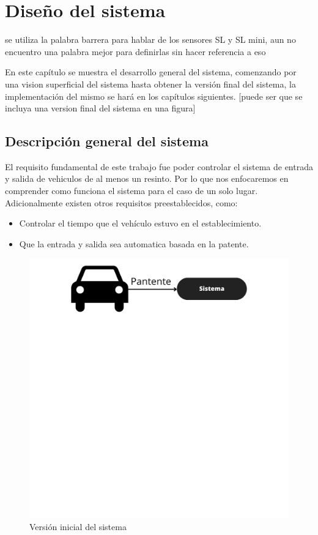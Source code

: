 \chapter{Diseño del sistema}

 {\huge se utiliza la palabra barrera para hablar de los sensores SL y SL mini, aun no encuentro una palabra mejor para definirlas sin hacer referencia a eso}

En este capítulo se muestra el desarrollo general del sistema, comenzando por una vision superficial del sistema hasta obtener la versión final del sistema, la implementación del mismo se hará en los capítulos siguientes. [puede ser que se incluya una version final del sistema en una figura]
\section{Descripción general del sistema}

El requisito fundamental de este trabajo fue poder controlar el sistema de entrada y salida de vehiculos de al menos un resinto. Por lo que nos enfocaremos en comprender como funciona el sistema para el caso de un solo lugar. Adicionalmente existen otros requisitos preestablecidos, como:

\begin{itemize}
    \item Controlar el tiempo que el vehículo estuvo en el establecimiento.
    \item Que la entrada y salida sea automatica basada en la patente.
\end{itemize}


\begin{figure}
    \centering
    \includegraphics[width=.8\textwidth]{imgs/sistema-base.png}
    \caption{Versión inicial del sistema}
    \label{fig:sistema-base}
\end{figure}

